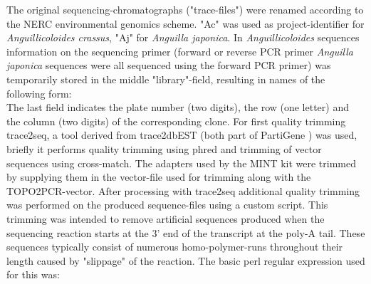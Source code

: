 
The original sequencing-chromatographs ("trace-files") were renamed
according to the NERC environmental genomics scheme. "Ac" was used as
project-identifier for \textit{Anguillicoloides crassus}, "Aj" for
\textit{Anguilla japonica}. In \textit{Anguillicoloides} sequences
information on the sequencing primer (forward or reverse PCR primer
\textit{Anguilla japonica} sequences were all sequenced using the
forward PCR primer) was temporarily stored in the middle
"library"-field, resulting in names of the following form:\\


The last field indicates the plate number (two digits), the row (one
letter) and the column (two digits) of the corresponding clone. For
first quality trimming trace2seq, a tool derived from trace2dbEST
(both part of PartiGene \cite{parkinson_partigene--constructing_2004})
was used, briefly it performs quality trimming using
phred\cite{ewing_base-calling_1998} and trimming of vector sequences
using cross-match\cite{PHRAP}. The adapters used by the MINT kit were
trimmed by supplying them in the vector-file used for trimming along
with the TOPO2PCR-vector.  After processing with trace2seq additional
quality trimming was performed on the produced sequence-files using a
custom script. This trimming was intended to remove artificial
sequences produced when the sequencing reaction starts at the 3' end
of the transcript at the poly-A tail. These sequences typically
consist of numerous homo-polymer-runs throughout their length caused
by "slippage" of the reaction.
The basic perl regular expression used for this was:\\

